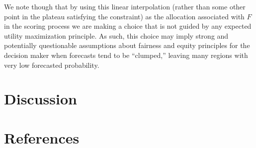 \documentclass{article}
\begin{document}
We note though that by using this linear interpolation (rather than some other point in the plateau satisfying the constraint) as the allocation associated with $F$ in the scoring process we are making a choice that is not
guided by any expected utility maximization principle. As such, this choice may imply strong and potentially questionable assumptions about fairness and
equity principles for the decision maker when forecasts tend to be ``clumped,'' leaving many regions with very low forecasted probability.


\section{Discussion}
\label{sec:discussion}


\section{References}


\end{document}
